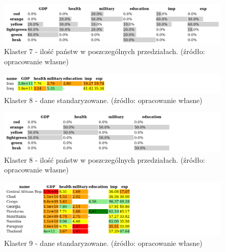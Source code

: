 \documentclass[11pt]{report}
\begin{document}
    \begin{figure}[ht!]
        \centering
        \includegraphics[width=1 \textwidth]{tables/CLUST/cluster7stdkmeanscount.png}
        \caption{Klaster 7 - ilość państw w poszczególnych przedziałach. (źródło: opracowanie własne)}
        \label{tab:cl7stdcount}
    \end{figure}

    

    \begin{figure}[ht!]
        \centering
        \includegraphics[width=1 \textwidth]{tables/CLUST/cluster8stdkmeans.png}
        \caption{Klaster 8 - dane standaryzowane. (źródło: opracowanie własne)}
        \label{tab:cl8std}
    \end{figure}

    \begin{figure}[ht!]
        \centering
        \includegraphics[width=1 \textwidth]{tables/CLUST/cluster8stdkmeanscount.png}
        \caption{Klaster 8 - ilość państw w poszczególnych przedziałach. (źródło: opracowanie własne)}
        \label{tab:cl8stdcount}
    \end{figure}

    

    \begin{figure}[ht!]
        \centering
        \includegraphics[width=1 \textwidth]{tables/CLUST/cluster9stdkmeans.png}
        \caption{Klaster 9 - dane standaryzowane. (źródło: opracowanie własne)}
        \label{tab:cl9std}
    \end{figure}
\end{document}
